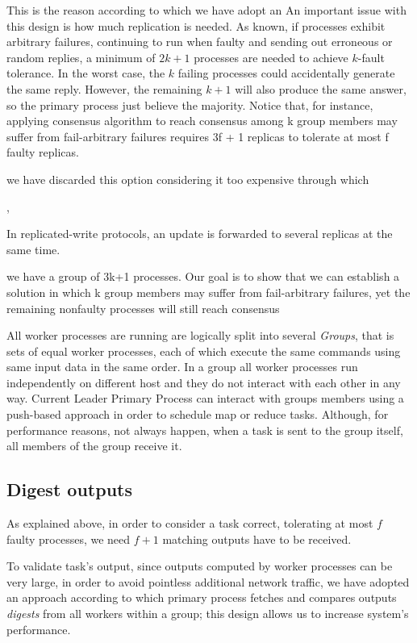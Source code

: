 \documentclass[sigchi]{acmart}
\begin{document}
This is the reason according to which we have adopt an 
An important issue with this design is how much replication is needed. As known, if processes exhibit arbitrary failures, continuing to run when faulty and sending out erroneous or random replies, a minimum of $2k+1$ processes are needed to achieve $k$-fault tolerance. In the worst case, the $k$ failing processes could accidentally generate the same reply. However, the remaining $k+1$ will also produce the same answer, so the primary process just believe the majority. Notice that, for instance, applying consensus algorithm to reach consensus among k group members may suffer from fail-arbitrary failures requires 3f + 1 replicas to tolerate at most f faulty replicas.

 we have discarded this option considering it too expensive through which

,

In replicated-write protocols, an update is forwarded to several replicas at the same time. 


  we have a group of 3k+1 processes. Our goal is to show that we can establish a solution in which k group members may suffer from fail-arbitrary failures, yet the remaining nonfaulty processes will still reach consensus


All worker processes are running are logically split into several \textit{Groups}, that is sets of equal worker processes, each of which execute the same commands using same input data in the same order. In a group all worker processes run independently on different host and they do not interact with each other in any way. Current Leader Primary Process can interact with groups members using a push-based approach in order to schedule map or reduce tasks. Although, for performance reasons, not always happen, when a task is sent to the group itself, all members of the group receive it.



\subsection{Digest outputs} As explained above, in order to consider a task correct, tolerating at most $f$ faulty processes, we need $f + 1$ matching outputs have to be received. 

To validate task's output, since outputs computed by worker processes can be very large, in order to avoid pointless additional network traffic, we have adopted an approach according to which primary process fetches and compares outputs \textit{digests} from all workers within a group; this design allows us to increase system's performance.
\end{document}

